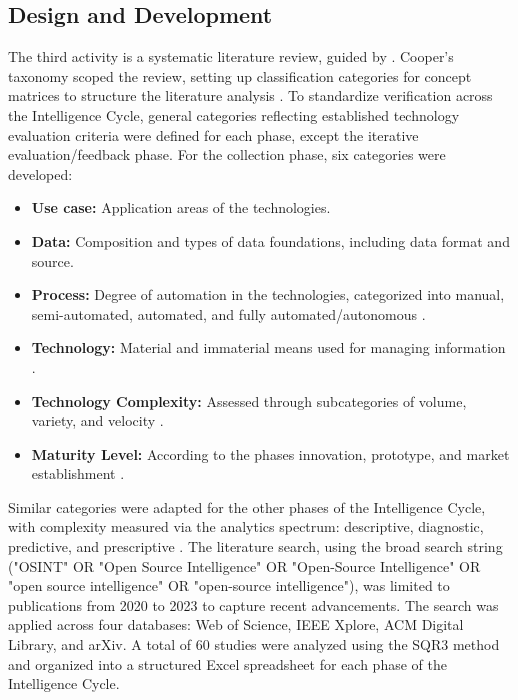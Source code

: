 \documentclass[10pt]{article}
\begin{document}
\subsection{Design and Development}
The third activity is a systematic literature review, guided by \cite{Cleven.2009}. Cooper's taxonomy \cite{Cooper.1988} scoped the review, setting up classification categories for concept matrices to structure the literature analysis \cite{Webster.2002}.
To standardize verification across the Intelligence Cycle, general categories reflecting established technology evaluation criteria were defined for each phase, except the iterative evaluation/feedback phase. For the collection phase, six categories were developed:
\begin{itemize}
    \item \textbf{Use case:} Application areas of the technologies.
    \item \textbf{Data:} Composition and types of data foundations, including data format and source.
    \item \textbf{Process:} Degree of automation in the technologies, categorized into manual, semi-automated, automated, and fully automated/autonomous \cite{Duncheon.2002, Billings.1997, Endsley.1999}.
    \item \textbf{Technology:} Material and immaterial means used for managing information \cite{Bleck.2004}.
    \item \textbf{Technology Complexity:} Assessed through subcategories of volume, variety, and velocity \cite{Elgendy.2014, Singh.2012}.
    \item \textbf{Maturity Level:} According to the phases innovation, prototype, and  market establishment \cite{Stich.2022}.
\end{itemize}

Similar categories were adapted for the other phases of the Intelligence Cycle, with complexity measured via the analytics spectrum: descriptive, diagnostic, predictive, and prescriptive \cite{Delen.2013}.
The literature search, using the broad search string ("OSINT" OR "Open Source Intelligence" OR "Open-Source Intelligence" OR "open source intelligence" OR "open-source intelligence"), was limited to publications from 2020 to 2023 to capture recent advancements. The search was applied across four databases: Web of Science, IEEE Xplore, ACM Digital Library, and arXiv. A total of 60 studies were analyzed using the SQR3 method \cite{Robinson.1970} and organized into a structured Excel spreadsheet for each phase of the Intelligence Cycle.
\end{document}
